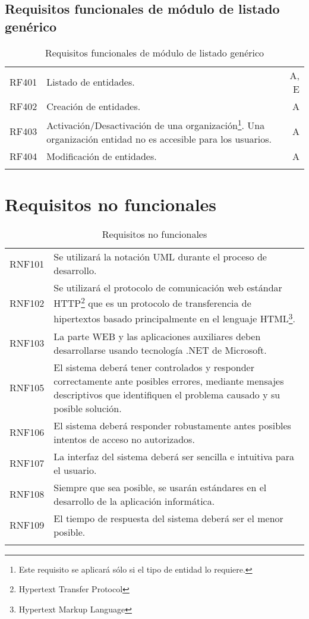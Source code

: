 \subsection{Requisitos funcionales de módulo de listado genérico}
\label{cuadro:requisitos-funcionales-de-organizaciones}
\begin{longtable}{l|p{13cm}|r}
  RF401\label{RF401} & Listado de entidades. & A, E \\
  RF402\label{RF402} & Creación de entidades. & A \\
  RF403\label{RF403} & Activación/Desactivación de una organización\footnote{Este requisito se aplicará sólo si el tipo de entidad lo requiere.}. Una organización entidad no es accesible para los usuarios. & A \\
  RF404\label{RF404} & Modificación de entidades. & A \\
  \caption{Requisitos funcionales de módulo de listado genérico} \\
\end{longtable}

\section{Requisitos no funcionales}

\label{cuadro:requisitos-no-funcionales}
\begin{longtable}{l|p{13.7cm}}  
  RNF101\label{RNF101} & Se utilizará la notación UML durante el proceso de desarrollo. \\
  RNF102\label{RNF102} & Se utilizará el protocolo de comunicación web estándar HTTP\footnote{Hypertext Transfer Protocol} que es un protocolo de transferencia de hipertextos basado principalmente en el lenguaje HTML\footnote{Hypertext Markup Language }. \\
  RNF103\label{RNF103} & La parte WEB y las aplicaciones auxiliares deben desarrollarse usando tecnología .NET de Microsoft. \\
  RNF105\label{RNF104} & El sistema deberá tener controlados y responder correctamente ante posibles errores, mediante mensajes descriptivos que identifiquen el problema causado y su posible solución. \\
  RNF106\label{RNF105} & El sistema deberá responder robustamente antes posibles intentos de acceso no autorizados. \\
  RNF107\label{RNF106} & La interfaz del sistema deberá ser sencilla e intuitiva para el usuario. \\
  RNF108\label{RNF107} & Siempre que sea posible, se usarán estándares en el desarrollo de la aplicación informática. \\
  RNF109\label{RNF108} & El tiempo de respuesta del sistema deberá ser el menor posible. \\
  \caption{Requisitos no funcionales} \\
\end{longtable}

